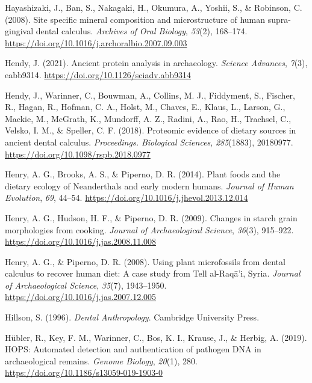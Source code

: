 \documentclass[
  b5paper,
]{book}
\newlength{\cslhangindent}
\newlength{\cslentryspacingunit} %
\newenvironment{CSLReferences}[2] %
 {%
  \setlength{\parindent}{0pt}
  \ifodd #1
  \let\oldpar\par
  \def\par{\hangindent=\cslhangindent\oldpar}
  \fi
  \setlength{\parskip}{#2\cslentryspacingunit}
 }%
 {}
\begin{document}
\begin{CSLReferences}{1}{0}
\leavevmode{}%
Hayashizaki, J., Ban, S., Nakagaki, H., Okumura, A., Yoshii, S., \&
Robinson, C. (2008). Site specific mineral composition and
microstructure of human supra-gingival dental calculus. \emph{Archives
of Oral Biology}, \emph{53}(2), 168--174.
\url{https://doi.org/10.1016/j.archoralbio.2007.09.003}

\leavevmode{}%
Hendy, J. (2021). Ancient protein analysis in archaeology. \emph{Science
Advances}, \emph{7}(3), eabb9314.
\url{https://doi.org/10.1126/sciadv.abb9314}

\leavevmode{}%
Hendy, J., Warinner, C., Bouwman, A., Collins, M. J., Fiddyment, S.,
Fischer, R., Hagan, R., Hofman, C. A., Holst, M., Chaves, E., Klaus, L.,
Larson, G., Mackie, M., McGrath, K., Mundorff, A. Z., Radini, A., Rao,
H., Trachsel, C., Velsko, I. M., \& Speller, C. F. (2018). Proteomic
evidence of dietary sources in ancient dental calculus.
\emph{Proceedings. Biological Sciences}, \emph{285}(1883), 20180977.
\url{https://doi.org/10.1098/rspb.2018.0977}

\leavevmode{}%
Henry, A. G., Brooks, A. S., \& Piperno, D. R. (2014). Plant foods and
the dietary ecology of {Neanderthals} and early modern humans.
\emph{Journal of Human Evolution}, \emph{69}, 44--54.
\url{https://doi.org/10.1016/j.jhevol.2013.12.014}

\leavevmode{}%
Henry, A. G., Hudson, H. F., \& Piperno, D. R. (2009). Changes in starch
grain morphologies from cooking. \emph{Journal of Archaeological
Science}, \emph{36}(3), 915--922.
\url{https://doi.org/10.1016/j.jas.2008.11.008}

\leavevmode{}%
Henry, A. G., \& Piperno, D. R. (2008). Using plant microfossils from
dental calculus to recover human diet: A case study from {Tell}
al-{Raq{ā}}'i, {Syria}. \emph{Journal of Archaeological Science},
\emph{35}(7), 1943--1950.
\url{https://doi.org/10.1016/j.jas.2007.12.005}

\leavevmode{}%
Hillson, S. (1996). \emph{Dental {Anthropology}}. {Cambridge University
Press}.

\leavevmode{}%
Hübler, R., Key, F. M., Warinner, C., Bos, K. I., Krause, J., \& Herbig,
A. (2019). {HOPS}: Automated detection and authentication of pathogen
{DNA} in archaeological remains. \emph{Genome Biology}, \emph{20}(1),
280. \url{https://doi.org/10.1186/s13059-019-1903-0}


\end{CSLReferences}
\end{document}
